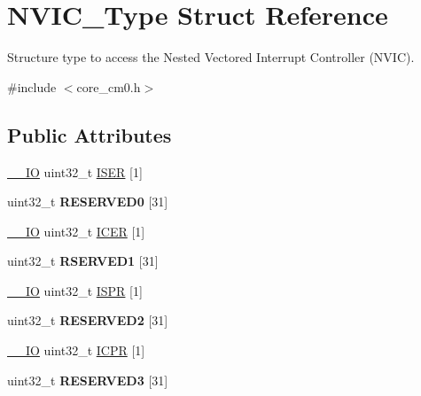 \hypertarget{structNVIC__Type}{}\section{N\+V\+I\+C\+\_\+\+Type Struct Reference}
\label{structNVIC__Type}


Structure type to access the Nested Vectored Interrupt Controller (N\+V\+IC).  




{\ttfamily \#include $<$core\+\_\+cm0.\+h$>$}

\subsection*{Public Attributes}
\begin{DoxyCompactItemize}
\item 
\hyperlink{core__sc300_8h_aec43007d9998a0a0e01faede4133d6be}{\+\_\+\+\_\+\+IO} uint32\+\_\+t \hyperlink{structNVIC__Type_aaff305f50a7117272e5523ec17cff9ec}{I\+S\+ER} \mbox{[}1\mbox{]}
\item 
uint32\+\_\+t {\bfseries R\+E\+S\+E\+R\+V\+E\+D0} \mbox{[}31\mbox{]}\hypertarget{structNVIC__Type_adbb4fba725419a6bb67635b05d6f1131}{}\label{structNVIC__Type_adbb4fba725419a6bb67635b05d6f1131}

\item 
\hyperlink{core__sc300_8h_aec43007d9998a0a0e01faede4133d6be}{\+\_\+\+\_\+\+IO} uint32\+\_\+t \hyperlink{structNVIC__Type_a856fba9cb1acc608fc03d8f2451bb16a}{I\+C\+ER} \mbox{[}1\mbox{]}
\item 
uint32\+\_\+t {\bfseries R\+S\+E\+R\+V\+E\+D1} \mbox{[}31\mbox{]}\hypertarget{structNVIC__Type_af524cfb2fdc825d4812449d2e4544a33}{}\label{structNVIC__Type_af524cfb2fdc825d4812449d2e4544a33}

\item 
\hyperlink{core__sc300_8h_aec43007d9998a0a0e01faede4133d6be}{\+\_\+\+\_\+\+IO} uint32\+\_\+t \hyperlink{structNVIC__Type_aa98673f8401e00b2dc73003a4d747e0b}{I\+S\+PR} \mbox{[}1\mbox{]}
\item 
uint32\+\_\+t {\bfseries R\+E\+S\+E\+R\+V\+E\+D2} \mbox{[}31\mbox{]}\hypertarget{structNVIC__Type_ac347bab19adf93f1ed4aa2e719f20c66}{}\label{structNVIC__Type_ac347bab19adf93f1ed4aa2e719f20c66}

\item 
\hyperlink{core__sc300_8h_aec43007d9998a0a0e01faede4133d6be}{\+\_\+\+\_\+\+IO} uint32\+\_\+t \hyperlink{structNVIC__Type_a7483899bfdf859f059384dd9aacd0072}{I\+C\+PR} \mbox{[}1\mbox{]}
\item 
uint32\+\_\+t {\bfseries R\+E\+S\+E\+R\+V\+E\+D3} \mbox{[}31\mbox{]}\hypertarget{structNVIC__Type_a0f3f8095a2d0128337d7c3762a6fbd33}{}\label{structNVIC__Type_a0f3f8095a2d0128337d7c3762a6fbd33}


\end{DoxyCompactItemize}
